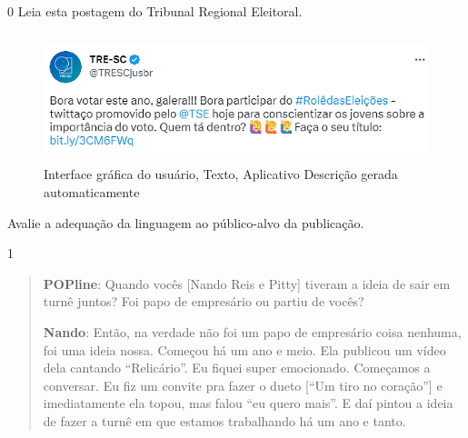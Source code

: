 


\num{0} Leia esta postagem do Tribunal Regional Eleitoral.

\begin{figure}
\centering
\includegraphics[width=5.26042in,height=1.47161in]{./imgSAEB_8_POR/media/image27.png}
\caption{Interface gráfica do usuário, Texto, Aplicativo Descrição
gerada automaticamente}
\end{figure}

Avalie a adequação da linguagem ao público-alvo da publicação.



\num{1}

\begin{quote}\textbf{POPline}: Quando vocês {[}Nando Reis e Pitty{]} tiveram a ideia
de sair em turnê juntos? Foi papo de empresário ou partiu de vocês?

\textbf{Nando}: Então, na verdade não foi um papo de empresário coisa
nenhuma, foi uma ideia nossa. Começou há um ano e meio. Ela publicou um
vídeo dela cantando ``Relicário''. Eu fiquei super emocionado. Começamos
a conversar. Eu fiz um convite pra fazer o dueto {[}``Um tiro no
coração''{]} e imediatamente ela topou, mas falou ``eu quero mais''. E
daí pintou a ideia de fazer a turnê em que estamos trabalhando há um ano
e tanto.
\end{quote}


